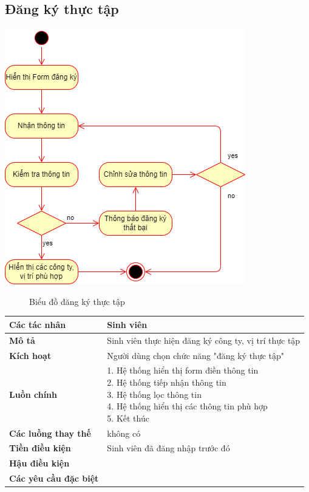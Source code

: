 \subsection{Đăng ký thực tập}
  \begin{center}
    \includegraphics[width=.9\textwidth]{../drawio/activity/register_thuctap.png}
    \begin{figure}[h]
      \centering
      \caption{Biểu đồ đăng ký thực tập}
    \end{figure}
  \end{center}
	\begin{tabular}{|l|l|}
		\hline
		\textbf{Các tác nhân}       & Sinh viên \\
		\hline
		\textbf{Mô tả}              & Sinh viên thực hiện đăng ký công ty, vị trí thực tập                                         \\
		\hline
		\textbf{Kích hoạt}          & Người dùng chọn chức năng "đăng ký thực tập" \\
		\hline
		\textbf{Luồn chính}         & \makecell[l]{1. Hệ thống hiển thị form điền thông tin \\ 2. Hệ thống tiếp nhận thông tin \\ 3. Hệ thống lọc thông tin \\ 4. Hệ thống hiển thị các thông tin phù hợp \\ 5. Kết thúc} \\
		\hline
		\textbf{Các luồng thay thế} & không có                                                   \\
		\hline
		\textbf{Tiền điều kiện}     & Sinh viên đã đăng nhập trước đó                                                   \\
		\hline
		\textbf{Hậu điều kiện}      &                                                     \\
		\hline
    \textbf{Các yêu cầu đặc biệt} & \\
    \hline
	\end{tabular}


